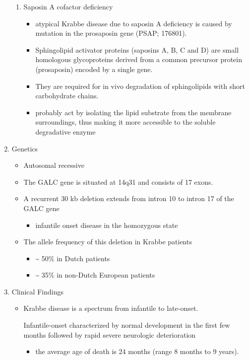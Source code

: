 \documentclass{scrartcl}
\begin{document}
\begin{enumerate}
\begin{enumerate}
\item Saposin A cofactor deficiency
\label{sec:org42520b6}

\begin{itemize}
\item atypical Krabbe disease due to saposin A deficiency is caused by mutation in the prosaposin gene (PSAP; 176801).
\item Sphingolipid activator proteins (saposins A, B, C and D) are small
homologous glycoproteins derived from a common precursor protein
(prosaposin) encoded by a single gene.
\item They are required for in vivo degradation of sphingolipids with short carbohydrate chains.
\item probably act by isolating the lipid substrate from the membrane
surroundings, thus making it more accessible to the soluble
degradative enzyme
\end{itemize}
\end{enumerate}

\item Genetics
\label{sec:orgb531af2}
\begin{itemize}
\item Autosomal recessive
\item The GALC gene is situated at 14q31 and consists of 17 exons.
\item A recurrent 30 kb deletion extends from intron 10 to intron 17 of the GALC gene
\begin{itemize}
\item infantile onset disease in the homozygous state
\end{itemize}
\item The allele frequency of this deletion in Krabbe patients
\begin{itemize}
\item \textasciitilde{} 50\% in Dutch patients
\item \textasciitilde{} 35\% in non-Dutch European patients
\end{itemize}
\end{itemize}

\item Clinical Findings
\label{sec:org1ff6a50}
\begin{itemize}
\item Krabbe disease is a spectrum from infantile to late-onset.

\item[{Infantile-onset}] characterized by normal development in the first
few months followed by rapid severe neurologic deterioration
\begin{itemize}
\item the average age of death is 24 months (range 8 months to 9 years).
\end{itemize}


\end{itemize}
\end{enumerate}
\end{document}
